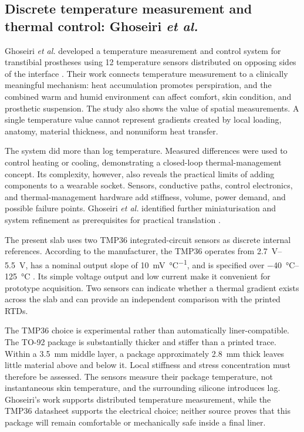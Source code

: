 \documentclass[12pt,a4paper]{article}
\begin{document}
\subsection{Discrete temperature measurement and thermal control:
Ghoseiri \textit{et al.}}

Ghoseiri \textit{et al.} developed a temperature measurement and control system
for transtibial prostheses using 12 temperature sensors distributed on opposing
sides of the interface \cite{ghoseiri2018}. Their work connects temperature
measurement to a clinically meaningful mechanism: heat accumulation promotes
perspiration, and the combined warm and humid environment can affect comfort,
skin condition, and prosthetic suspension. The study also shows the value of
spatial measurements. A single temperature value cannot represent gradients
created by local loading, anatomy, material thickness, and nonuniform heat
transfer.

The system did more than log temperature. Measured differences were used to
control heating or cooling, demonstrating a closed-loop thermal-management
concept. Its complexity, however, also reveals the practical limits of adding
components to a wearable socket. Sensors, conductive paths, control
electronics, and thermal-management hardware add stiffness, volume, power
demand, and possible failure points. Ghoseiri \textit{et al.} identified further
miniaturisation and system refinement as prerequisites for practical
translation \cite{ghoseiri2018}.

The present slab uses two TMP36 integrated-circuit sensors as discrete internal
references. According to the manufacturer, the TMP36 operates from
\SIrange{2.7}{5.5}{\volt}, has a nominal output slope of
\SI{10}{\milli\volt\per\degreeCelsius}, and is specified over
\SIrange{-40}{125}{\degreeCelsius} \cite{tmp36}. Its simple voltage output and
low current make it convenient for prototype acquisition. Two sensors can
indicate whether a thermal gradient exists across the slab and can provide an
independent comparison with the printed RTDs.

The TMP36 choice is experimental rather than automatically liner-compatible.
The TO-92 package is substantially thicker and stiffer than a printed trace.
Within a \SI{3.5}{\milli\metre} middle layer, a package approximately
\SI{2.8}{\milli\metre} thick leaves little material above and below it. Local
stiffness and stress concentration must therefore be assessed. The sensors
measure their package temperature, not instantaneous skin temperature, and the
surrounding silicone introduces lag. Ghoseiri's work supports distributed
temperature measurement, while the TMP36 datasheet supports the electrical
choice; neither source proves that this package will remain comfortable or
mechanically safe inside a final liner.
\end{document}
